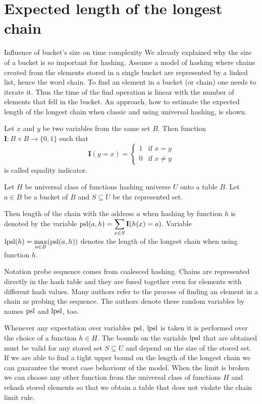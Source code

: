 \chapter{Expected length of the longest chain}

\begin{section}{Influence of bucket's size on time complexity}
We already explained why the size of a bucket is so important for hashing. Assume a model of hashing where chains created from the elements stored in a single bucket are represented by a linked list, hence the word chain. To find an element in a bucket (or chain) one needs to iterate it. Thus the time of the find operation is linear with the number of elements that fell in the bucket. An approach, how to estimate the expected length of the longest chain when classic and using universal hashing, is shown.

\begin{definition}
Let $x$ and $y$ be two variables from the same set $B$. Then function $\mathbf{I}: B \times B \rightarrow \{0, 1\}$ such that
\[
 \mathbf{I}(y = x) =
  \begin{cases}
   1 & \text{if } x = y \\
   0 & \text{if } x \neq y
  \end{cases}
\]
is called equality indicator.
\end{definition}

\begin{definition}
Let $H$ be universal class of functions hashing universe $U$ onto a table $B$. Let $a \in B$ be a bucket of $B$ and $S \subseteq U$ be the represented set. 

Then length of the chain with the address $a$ when hashing by function $h$ is denoted by the variable $\mathrm{psl}(a, h) = \displaystyle \sum_{x \in S} \mathbf{I}(h(x) = a)$. Variable $\mathrm{lpsl}(h) = \displaystyle \max_{a \in B} (\mathrm{psl}(a, h))$ denotes the length of the longest chain when using function $h$.
\end{definition}

Notation probe sequence comes from coalesced hashing. Chains are represented directly in the hash table and they are fused together even for elements with different hash values. Many authors refer to the process of finding an element in a chain as probing the sequence. The authors denote these random variables by names $\mathrm{psl}$ and $\mathrm{lpsl}$, too. %

Whenever any expectation over variables $\mathrm{psl}$, $\mathrm{lpsl}$ is taken it is performed over the choice of a function $h \in H$. The bounds on the variable $\mathrm{lpsl}$ that are obtained must be valid for any stored set $S \subseteq U$ and depend on the size of the stored set. If we are able to find a tight upper bound on the length of the longest chain we can guarantee the worst case behaviour of the model. When the limit is broken we can choose any other function from the universal class of functions $H$ and rehash stored elements so that we obtain a table that does not violate the chain limit rule.


\end{section}
